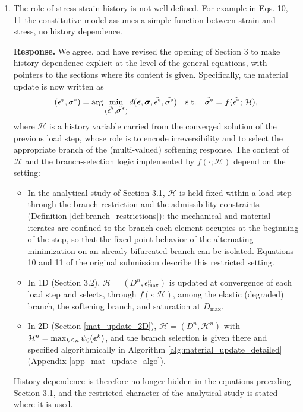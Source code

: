 \documentclass[10pt]{article}
\begin{document}
\begin{enumerate}
\item The role of stress-strain history is not well defined. For example in Eqs. 10, 11 the constitutive model assumes a simple function between strain and stress, no history dependence.

\color{blue}
\textbf{Response.} We agree, and have revised the opening of Section 3 to make history dependence explicit at the level of the general equations, with pointers to the sections where its content is given. Specifically, the material update is now written as
%
\begin{equation*}
	(\mbox{$\epsilon^*$},\mbox{$\sigma^*$}) = \arg \min_{(\tilde{\mbox{$\epsilon^*$}},\tilde{\mbox{$\sigma^*$}})} d(\mbox{\boldmath $\epsilon$},\mbox{\boldmath $\sigma$},\tilde{\mbox{$\epsilon^*$}},\tilde{\mbox{$\sigma^*$}}) \quad \text{s.t.} \quad \tilde{\mbox{$\sigma^*$}}=f(\tilde{\mbox{$\epsilon^*$}};\,\mathcal{H}),
\end{equation*}
%
where $\mathcal{H}$ is a history variable carried from the converged solution of the previous load step, whose role is to encode irreversibility and to select the appropriate branch of the (multi-valued) softening response. The content of $\mathcal{H}$ and the branch-selection logic implemented by $f(\cdot;\mathcal{H})$ depend on the setting:
\begin{itemize}
	\item In the analytical study of Section 3.1, $\mathcal{H}$ is held fixed within a load step through the branch restriction and the admissibility constraints (Definition \ref{def:branch_restrictions}): the mechanical and material iterates are confined to the branch each element occupies at the beginning of the step, so that the fixed-point behavior of the alternating minimization on an already bifurcated branch can be isolated. Equations 10 and 11 of the original submission describe this restricted setting.
	\item In 1D (Section 3.2), $\mathcal{H}=(D^n,\epsilon^n_{\max})$ is updated at convergence of each load step and selects, through $f(\cdot;\mathcal{H})$, among the elastic (degraded) branch, the softening branch, and saturation at $D_{\max}$.
	\item In 2D (Section \ref{mat_update_2D}), $\mathcal{H}=(D^n,\mathcal{H}^n)$ with $\mathcal{H}^n = \max_{k \leq n} \psi_0(\mbox{\boldmath $\epsilon$}^k)$, and the branch selection is given there and specified algorithmically in Algorithm \ref{alg:material_update_detailed} (Appendix \ref{app_mat_update_algo}).
\end{itemize}
%
History dependence is therefore no longer hidden in the equations preceding Section 3.1, and the restricted character of the analytical study is stated where it is used.


\end{enumerate}
\end{document}
